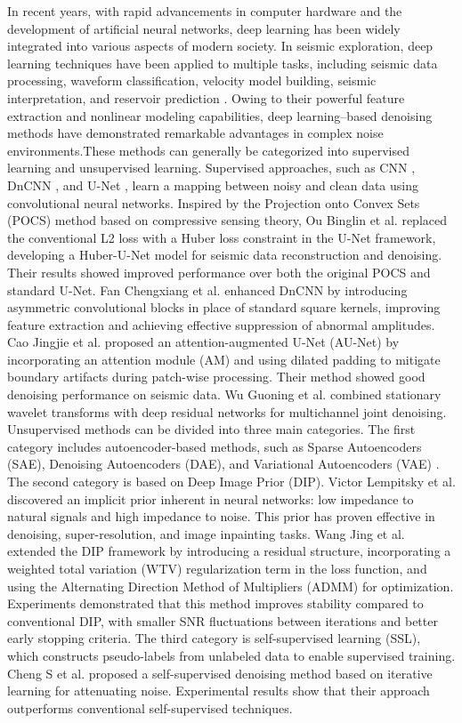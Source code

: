 \documentclass[preprint,12pt]{elsarticle}
\begin{document}
In recent years, with rapid advancements in computer hardware and the development of artificial neural networks, deep learning has been widely integrated into various aspects of modern society. In seismic exploration, deep learning techniques have been applied to multiple tasks, including seismic data processing, waveform classification, velocity model building, seismic interpretation, and reservoir prediction \cite{zhang24}. Owing to their powerful feature extraction and nonlinear modeling capabilities, deep learning–based denoising methods have demonstrated remarkable advantages in complex noise environments.These methods can generally be categorized into supervised learning and unsupervised learning. Supervised approaches, such as CNN \cite{yu19}, DnCNN \cite{zhang17}, and U-Net \cite{chai21}, learn a mapping between noisy and clean data using convolutional neural networks. Inspired by the Projection onto Convex Sets (POCS) method based on compressive sensing theory, Ou Binglin et al. \cite{ou23} replaced the conventional L2 loss with a Huber loss constraint in the U-Net framework, developing a Huber-U-Net model for seismic data reconstruction and denoising. Their results showed improved performance over both the original POCS and standard U-Net. Fan Chengxiang et al. \cite{fan23} enhanced DnCNN by introducing asymmetric convolutional blocks in place of standard square kernels, improving feature extraction and achieving effective suppression of abnormal amplitudes. Cao Jingjie et al. \cite{cao24} proposed an attention-augmented U-Net (AU-Net) by incorporating an attention module (AM) and using dilated padding to mitigate boundary artifacts during patch-wise processing. Their method showed good denoising performance on seismic data. Wu Guoning et al. \cite{wu22} combined stationary wavelet transforms with deep residual networks for multichannel joint denoising. Unsupervised methods can be divided into three main categories. The first category includes autoencoder-based methods, such as Sparse Autoencoders (SAE), Denoising Autoencoders (DAE), and Variational Autoencoders (VAE) \cite{vincent10}. The second category is based on Deep Image Prior (DIP). Victor Lempitsky et al. \cite{ulyanov18} discovered an implicit prior inherent in neural networks: low impedance to natural signals and high impedance to noise. This prior has proven effective in denoising, super-resolution, and image inpainting tasks. Wang Jing et al. \cite{wang23} extended the DIP framework by introducing a residual structure, incorporating a weighted total variation (WTV) regularization term in the loss function, and using the Alternating Direction Method of Multipliers (ADMM) for optimization. Experiments demonstrated that this method improves stability compared to conventional DIP, with smaller SNR fluctuations between iterations and better early stopping criteria. The third category is self-supervised learning (SSL), which constructs pseudo-labels from unlabeled data to enable supervised training. Cheng S et al. \cite{cheng24} proposed a self-supervised denoising method based on iterative learning for attenuating noise. Experimental results show that their approach outperforms conventional self-supervised techniques.
\end{document}

